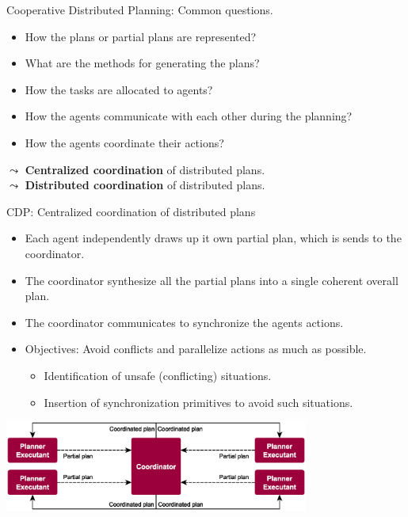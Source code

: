 \documentclass[9pt]{beamer}
\begin{document}
\begin{frame}{Cooperative Distributed Planning: Common questions.}
\begin{small}
\begin{itemize}
\item How the plans or partial plans are represented? 
\item What are the methods for generating the plans?
\item How the tasks are allocated to agents? 
\item How the agents communicate with each other during the planning? 
\item How the agents coordinate their actions?
\end{itemize}

\vspace{4mm}

$\leadsto$ \textbf{\textcolor{CS-1light}{Centralized coordination}} of distributed plans.\\

$\leadsto$ \textbf{\textcolor{CS-1light}{Distributed coordination}} of distributed plans.
\end{small}
\end{frame}

\begin{frame}{CDP: Centralized coordination of distributed plans}
\begin{small}

\begin{itemize}
\item Each agent independently draws up it own partial plan, which is sends to the coordinator. 
\item The coordinator synthesize all the partial plans into a single coherent overall plan. 
\item The coordinator communicates to synchronize the agents actions. 
\item Objectives: Avoid conflicts and parallelize actions as much as possible.
\begin{itemize}
\item Identification of unsafe (conflicting) situations.
\item Insertion of synchronization primitives to avoid such situations. 
\end{itemize}
\end{itemize}

\begin{center}
\includegraphics[keepaspectratio,width=0.75\textwidth]{images/mas_planning_cdp_central.eps}
\end{center}
\end{small}
\end{frame}
\end{document}
